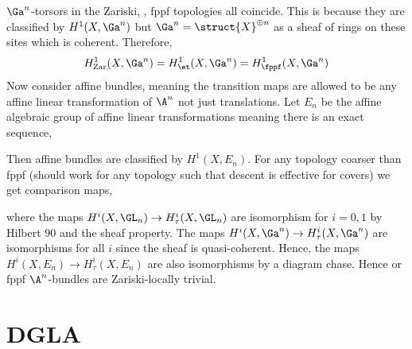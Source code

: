 \documentclass[12pt]{article}
\begin{document}
\newcommand{\Zar}{\mathrm{Zar}}


$\Ga^n$-torsors in the Zariski, \etale, fppf topologies all coincide. This is because they are classified by $H^1(X, \Ga^n)$ but $\Ga^n = \struct{X}^{\oplus n}$ as a sheaf of rings on these sites which is coherent. Therefore, 
\[ H^1_{\Zar}(X, \Ga^n) = H^1_{\et}(X, \Ga^n) = H^1_{\fppf}(X, \Ga^n) \]
Now consider affine bundles, meaning the transition maps are allowed to be any affine linear transformation of $\A^n$ not just translations. Let $E_n$ be the affine algebraic group of affine linear transformations meaning there is an exact sequence,
\begin{center}
\end{center}
Then affine bundles are classified by $H^1(X, E_n)$. For any topology coarser than fppf (should work for any topology such that descent is effective for covers) we get comparison maps,
\begin{center}
\end{center}
where the maps $H^i(X, \GL_n) \to H^i_{\tau}(X, \GL_n)$ are isomorphism for $i = 0,1$ by Hilbert 90 and the sheaf property. The maps $H^i(X, \Ga^n) \to H^i_{\tau}(X, \Ga^n)$ are isomorphisms for all $i$ since the sheaf is quasi-coherent. Hence, the maps $H^i(X, E_n) \to H^i_{\tau}(X, E_n)$ are also isomorphisms by a diagram chase. Hence \etale or fppf $\A^n$-bundles are Zariski-locally trivial.

\section{DGLA}
\end{document}
